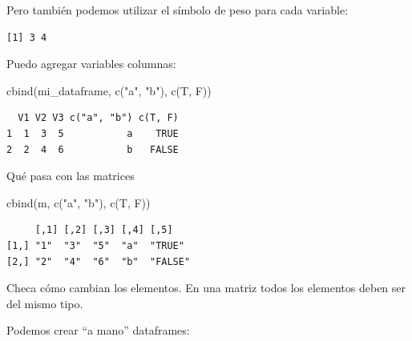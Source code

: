 \documentclass[
  letterpaper,
  DIV=11,
  numbers=noendperiod]{scrreprt}
\newenvironment{Shaded}{\begin{snugshade}}{\end{snugshade}}
\newcommand{\FunctionTok}[1]{\textcolor[rgb]{0.28,0.35,0.67}{#1}}
\newcommand{\NormalTok}[1]{\textcolor[rgb]{0.00,0.23,0.31}{#1}}
\newcommand{\SpecialCharTok}[1]{\textcolor[rgb]{0.37,0.37,0.37}{#1}}
\newcommand{\StringTok}[1]{\textcolor[rgb]{0.13,0.47,0.30}{#1}}
\begin{document}
Pero también podemos utilizar el símbolo de peso para cada variable:

\begin{Shaded}
\end{Shaded}

\begin{verbatim}
[1] 3 4
\end{verbatim}

Puedo agregar variables columnas:

\begin{Shaded}
\begin{Highlighting}[]
\FunctionTok{cbind}\NormalTok{(mi\_dataframe, }\FunctionTok{c}\NormalTok{(}\StringTok{"a"}\NormalTok{, }\StringTok{"b"}\NormalTok{), }\FunctionTok{c}\NormalTok{(T, F))}
\end{Highlighting}
\end{Shaded}

\begin{verbatim}
  V1 V2 V3 c("a", "b") c(T, F)
1  1  3  5           a    TRUE
2  2  4  6           b   FALSE
\end{verbatim}

Qué pasa con las matrices

\begin{Shaded}
\begin{Highlighting}[]
\FunctionTok{cbind}\NormalTok{(m, }\FunctionTok{c}\NormalTok{(}\StringTok{"a"}\NormalTok{, }\StringTok{"b"}\NormalTok{),  }\FunctionTok{c}\NormalTok{(T, F))}
\end{Highlighting}
\end{Shaded}

\begin{verbatim}
     [,1] [,2] [,3] [,4] [,5]   
[1,] "1"  "3"  "5"  "a"  "TRUE" 
[2,] "2"  "4"  "6"  "b"  "FALSE"
\end{verbatim}

Checa cómo cambian los elementos. En una matriz todos los elementos
deben ser del mismo tipo.

Podemos crear ``a mano'' dataframes:
\end{document}
